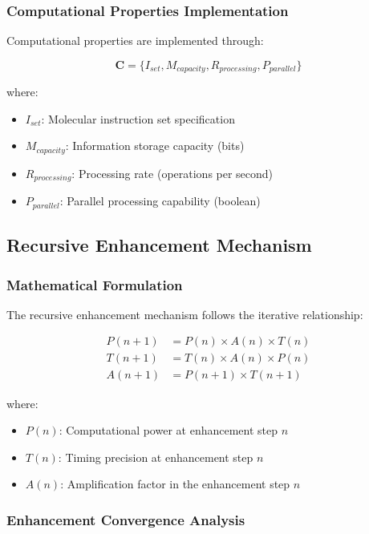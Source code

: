\documentclass[12pt,a4paper]{article}
\begin{document}
\subsubsection{Computational Properties Implementation}

Computational properties are implemented through:

\begin{equation}
\boldsymbol{C} = \{I_{set}, M_{capacity}, R_{processing}, P_{parallel}\}
\end{equation}

where:
\begin{itemize}
\item $I_{set}$: Molecular instruction set specification
\item $M_{capacity}$: Information storage capacity (bits)
\item $R_{processing}$: Processing rate (operations per second)
\item $P_{parallel}$: Parallel processing capability (boolean)
\end{itemize}

\subsection{Recursive Enhancement Mechanism}

\subsubsection{Mathematical Formulation}

The recursive enhancement mechanism follows the iterative relationship:

\begin{align}
P(n+1) &= P(n) \times A(n) \times T(n) \\
T(n+1) &= T(n) \times A(n) \times P(n) \\
A(n+1) &= P(n+1) \times T(n+1)
\end{align}

where:
\begin{itemize}
\item $P(n)$: Computational power at enhancement step $n$
\item $T(n)$: Timing precision at enhancement step $n$
\item $A(n)$: Amplification factor in the enhancement step $n$
\end{itemize}

\subsubsection{Enhancement Convergence Analysis}
\end{document}
